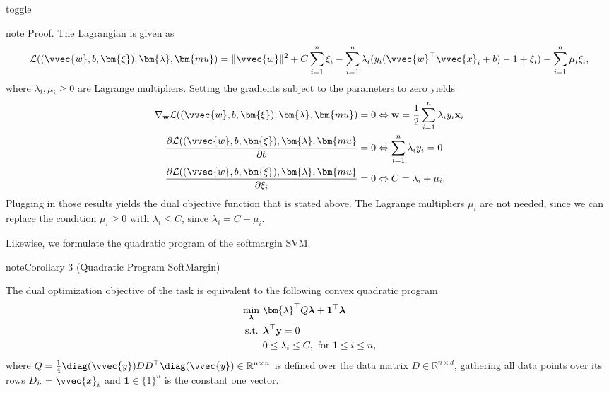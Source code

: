 \documentclass[letterpaper,10pt,english]{jupyterBook}
\begin{document}
\begin{sphinxuseclass}{toggle}
\begin{sphinxadmonition}{note}
\sphinxAtStartPar
Proof. The Lagrangian is given as
\begin{align*}
\mathcal{L}((\vvec{w},b,\bm{\xi}),\bm{\lambda},\bm{mu}) = \lVert\vvec{w}\rVert^2 +C\sum_{i=1}^n\xi_i -\sum_{i=1}^n\lambda_i(y_i(\vvec{w}^\top\vvec{x}_i +b)-1+\xi_i) -\sum_{i=1}^n\mu_i\xi_i,
\end{align*}
\sphinxAtStartPar
where \(\lambda_i,\mu_i\geq 0\) are Lagrange multipliers. Setting the gradients subject to the parameters to zero yields
\begin{align*}
\nabla_{\bf w} {\cal L}((\vvec{w},b,\bm{\xi}),\bm{\lambda},\bm{mu}) &= 0 \Leftrightarrow {\bf w} = \frac12\sum_{i=1}^{n} \lambda_{i} y_{i} {\bf x}_{i}\\
\frac{\partial {\cal L}((\vvec{w},b,\bm{\xi}),\bm{\lambda},\bm{mu}}{\partial b} &= 0 \Leftrightarrow \sum_{i=1}^{n} \lambda_{i} y_{i} = 0\\
\frac{\partial {\cal L}((\vvec{w},b,\bm{\xi}),\bm{\lambda},\bm{mu}}{\partial \xi_i} &= 0 \Leftrightarrow C = \lambda_i + \mu_i.
\end{align*}
\sphinxAtStartPar
Plugging in those results yields the dual objective function that is stated above. The Lagrange multipliers \(\mu_i\) are not needed, since we can replace the condition \(\mu_i\geq 0\) with \(\lambda_i\leq C\), since \(\lambda_i=C-\mu_i\).
\end{sphinxadmonition}

\end{sphinxuseclass}
\sphinxAtStartPar
Likewise, we formulate the quadratic program of the soft\sphinxhyphen{}margin SVM.
\label{classification_svms:corollary-8}
\begin{sphinxadmonition}{note}{Corollary 3 (Quadratic Program Soft\sphinxhyphen{}Margin)}



\sphinxAtStartPar
The dual optimization objective of the  task is equivalent to the following convex quadratic program
\begin{equation}\label{equation:classification_svms:svm_form10}
\begin{split}\begin{align*}
\min_{\boldsymbol{\lambda}}  \ & \bm{\lambda}^\top Q \boldsymbol{\lambda} + {\bf 1}^\top \boldsymbol{\lambda} \\
\text{s.t. } &   \boldsymbol{\lambda}^\top{\bf y}  = 0 \\
&  0 \leq \lambda_{i} \leq C, \text{ for }1\leq i\leq n,
\end{align*}\end{split}
\end{equation}
\sphinxAtStartPar
where \(Q=\frac14 \diag(\vvec{y})DD^\top\diag(\vvec{y})\in\mathbb{R}^{n\times n}\) is defined over the data matrix \(D\in\mathbb{R}^{n\times d}\), gathering all data points over its rows \(D_{i\cdot}=\vvec{x}_i\) and \(\mathbf{1}\in\{1\}^n\) is the constant one vector.
\end{sphinxadmonition}
\end{document}
